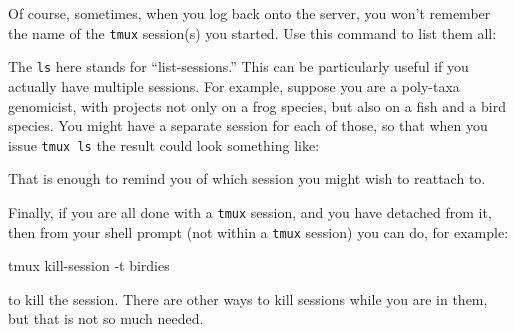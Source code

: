 \documentclass[]{krantz}
\makeatletter
\newenvironment{Shaded}{\begin{snugshade}}{\end{snugshade}}
\newcommand{\ExtensionTok}[1]{#1}
\newcommand{\NormalTok}[1]{#1}
\newenvironment{kframe}{%
\medskip{}
\setlength{\fboxsep}{.8em}
 \def\at@end@of@kframe{}%
 \ifinner\ifhmode%
  \def\at@end@of@kframe{\end{minipage}}%
  \begin{minipage}{\columnwidth}%
 \fi\fi%
 \def\FrameCommand##1{\hskip\@totalleftmargin \hskip-\fboxsep
 \colorbox{shadecolor}{##1}\hskip-\fboxsep
     \hskip-\linewidth \hskip-\@totalleftmargin \hskip\columnwidth}%
 \MakeFramed {\advance\hsize-\width
   \@totalleftmargin\z@ \linewidth\hsize
   \@setminipage}}%
 {\par\unskip\endMakeFramed%
 \at@end@of@kframe}
\renewenvironment{Shaded}{\begin{kframe}}{\end{kframe}}
\makeatother
\begin{document}
\begin{Shaded}
\begin{Highlighting}[]
\ExtensionTok{%
\end{Highlighting}
\end{Shaded}

Of course, sometimes, when you log back onto the server, you won't remember the name
of the \texttt{tmux} session(s) you started. Use this command to list them all:

\begin{Shaded}
\begin{Highlighting}[]
\ExtensionTok{%
\end{Highlighting}
\end{Shaded}

The \texttt{ls} here stands for ``list-sessions.'' This can be particularly useful if you
actually have multiple sessions. For example, suppose you are a poly-taxa genomicist,
with projects not only on a frog species, but also on a fish and a bird species. You
might have a separate session for each of those, so that when you issue \texttt{tmux\ ls} the
result could look something like:

\begin{Shaded}
\end{Shaded}

That is enough to remind you of which session you might wish to reattach to.

Finally, if you are all done with a \texttt{tmux} session, and you have detached from it,
then from your shell prompt (not within a \texttt{tmux} session) you can do, for example:

\begin{Shaded}
\begin{Highlighting}[]
\ExtensionTok{tmux}\NormalTok{ kill-session -t  birdies}
\end{Highlighting}
\end{Shaded}

to kill the session. There are other ways to kill sessions while you
are in them, but that is not so much needed.
\end{document}
